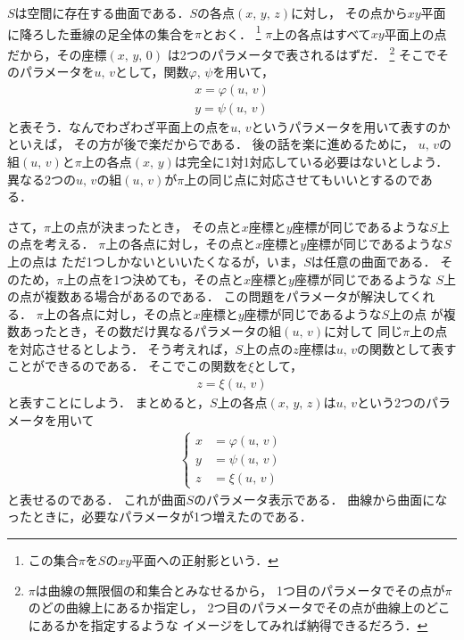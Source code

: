$S$は空間に存在する曲面である．$S$の各点$(x, \, y, \, z)$に対し，
その点から$xy$平面に降ろした垂線の足全体の集合を$\pi$とおく．
\footnote{この集合$\pi$を$S$の$xy$平面への正射影という．}
$\pi$上の各点はすべて$xy$平面上の点だから，その座標$(x, \, y, \, 0)$
は2つのパラメータで表されるはずだ．
\footnote{$\pi$は曲線の無限個の和集合とみなせるから，
1つ目のパラメータでその点が$\pi$のどの曲線上にあるか指定し，
2つ目のパラメータでその点が曲線上のどこにあるかを指定するような
イメージをしてみれば納得できるだろう．}
そこでそのパラメータを$u, \, v$として，関数$\varphi, \, \psi$を用いて，
\begin{align*}
x = \varphi (u, \, v) \\
y= \psi (u, \, v)
\end{align*}
と表そう．なんでわざわざ平面上の点を$u, \, v$というパラメータを用いて表すのかといえば，
その方が後で楽だからである．
後の話を楽に進めるために，
$u, \, v$の組$(u, \, v)$と$\pi$上の各点$(x, \, y)$は完全に1対1対応している必要はないとしよう．
異なる2つの$u, \, v$の組$(u, \, v)$が$\pi$上の同じ点に対応させてもいいとするのである．

さて，$\pi$上の点が決まったとき，
その点と$x$座標と$y$座標が同じであるような$S$上の点を考える．
$\pi$上の各点に対し，その点と$x$座標と$y$座標が同じであるような$S$上の点は
ただ1つしかないといいたくなるが，いま，$S$は任意の曲面である．
そのため，$\pi$上の点を1つ決めても，その点と$x$座標と$y$座標が同じであるような
$S$上の点が複数ある場合があるのである．
この問題をパラメータが解決してくれる．
$\pi$上の各点に対し，その点と$x$座標と$y$座標が同じであるような$S$上の点
が複数あったとき，その数だけ異なるパラメータの組$(u, \, v)$に対して
同じ$\pi$上の点を対応させるとしよう．
そう考えれば，$S$上の点の$z$座標は$u, \, v$の関数として表すことができるのである．
そこでこの関数を$\xi$として，
\begin{align*}
z = \xi (u, \, v)
\end{align*}
と表すことにしよう． まとめると，$S$上の各点$(x, \, y, \, z)$は$u, \, v$という2つのパラメータを用いて
\begin{align}
\left\{
\begin{aligned}
x & = \varphi (u, \, v) \\
y & = \psi (u, \, v) \\
z & = \xi (u, \, v)
\end{aligned}
\right.
\label{eq:kyokuparameta}
\end{align}
と表せるのである．
これが曲面$S$のパラメータ表示である．
曲線から曲面になったときに，必要なパラメータが1つ増えたのである．

